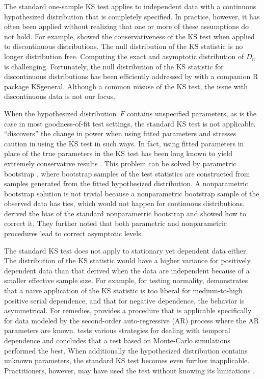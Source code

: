 \documentclass[12pt, letterpaper, titlepage]{article}
\begin{document}
The standard one-sample KS test applies to independent data with a continuous
hypothesized distribution that is completely specified. In practice, however, it
has often been applied without realizing that one or more of these assumptions
do not hold. For example, \citet{noether1963note} showed the conservativeness of
the KS test when applied to discontinuous distributions. The null distribution
of the KS statistic is no longer distribution free. Computing the
exact and asymptotic distribution of $D_n$ is challenging. Fortunately, the null
distribution of the KS statistic for discontinuous distributions has been
efficiently addressed by \citet{dimitrova2020computing} with a
companion R package \textsf{KSgeneral}. Although a common misuse of the KS test, 
the issue with discontinuous data is not our focus.


When the hypothesized distribution~$F$ contains unspecified parameters, as is
the case in most goodness-of-fit test settings, the standard KS test is not
applicable. \citet{steinskog2007cautionary} ``discovers'' the change in power
when using fitted parameters and stresses caution in using the KS test in
such ways. In fact, using fitted parameters in place of the true parameters in
the KS test has been long known to yield extremely conservative results
\citep[e.g.,][]{lilliefors1967kolmogorov}. This problem can be solved by
parametric bootstrap \citep{efron1985bootstrap, hall1991two}, where
bootstrap samples of the test statistics are constructed from samples
generated from the fitted hypothesized distribution. A nonparametric bootstrap
solution is not trivial because a nonparametric bootstrap sample of the
observed data has ties, which would not happen for continuous distributions.
\citet{babu2004goodness} derived the bias of the standard nonparametric 
bootstrap and
showed how to correct it. They further noted that both parametric and
nonparametric procedures lead to correct asymptotic levels.


The standard KS test does not apply to stationary yet dependent data either. The
distribution of the KS statistic would have a higher variance for positively
dependent data than that derived when the data are independent because of a
smaller effective sample size. For example, for testing normality,
\citet{durilleul1992lack} demonstrates that a naive application of
the KS statistic is too liberal for medium-to-high positive serial dependence,
and that for negative dependence, the behavior is asymmetrical. For remedies,
\citet{weiss1978modification} provides a procedure that is applicable 
specifically for data
modeled by the second-order auto-regressive (AR) process where the AR parameters
are known. \citet{lanzante2021testing} tests various strategies for dealing with
temporal
dependence and concludes that a test based on Monte-Carlo simulations performed
the best. When additionally the hypothesized distribution contains unknown
parameters, the standard KS test becomes even further
inapplicable. Practitioners, however, may have used the test without knowing its
limitations \citep[e.g.,][]{tuncer2019online}.
\end{document}
